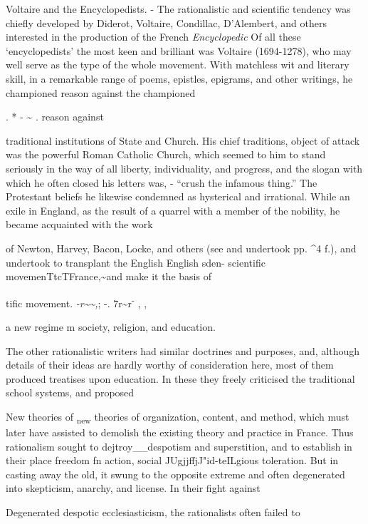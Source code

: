 \documentclass[]{book}
\begin{document}
Voltaire and the Encyclopedists. - The rationalistic and scientific tendency was chiefly developed by Diderot, Voltaire, Condillac, D'Alembert, and others interested in the production of the French \emph{Encyclopedic} Of all these `encyclopedists' the most keen and brilliant was Voltaire (1694-1278), who may well serve as the type of the whole movement. With matchless wit and literary skill, in a remarkable range of poems, epistles, epigrams, and other writings, he championed reason against the championed

. * - \textasciitilde{} . reason against

traditional institutions of State and Church. His chief traditions, object of attack was the powerful Roman Catholic Church, which seemed to him to stand seriously in the way of all liberty, individuality, and progress, and the slogan with which he often closed his letters was, - ``crush the infamous thing.'' The Protestant beliefs he likewise condemned as hysterical and irrational. While an exile in England, as the result of a quarrel with a member of the nobility, he became acquainted with the work

of Newton, Harvey, Bacon, Locke, and others (see and undertook pp. \^{}4 f.), and undertook to transplant the English English sden- scientific movemenTtcTFrance,\textasciitilde{}and make it the basis of

tific movement. \emph{-r\textasciitilde{}\textasciitilde{},}; -. 7r\textasciitilde{}r\textsuperscript{-} , ,

a new regime m society, religion, and education.

The other rationalistic writers had similar doctrines and purposes, and, although details of their ideas are hardly worthy of consideration here, most of them produced treatises upon education. In these they freely criticised the traditional school systems, and proposed

New theories of \textsubscript{new} theories of organization, content, and method, which must later have assisted to demolish the existing theory and practice in France. Thus rationalism sought to dejtroy\_\_despotism and superstition, and to establish in their place freedom fn action, social JUgjjffjJ"id-teILgious toleration. But in casting away the old, it swung to the opposite extreme and often degenerated into skepticism, anarchy, and license. In their fight against

Degenerated despotic ecclesiasticism, the rationalists often failed to
\end{document}
